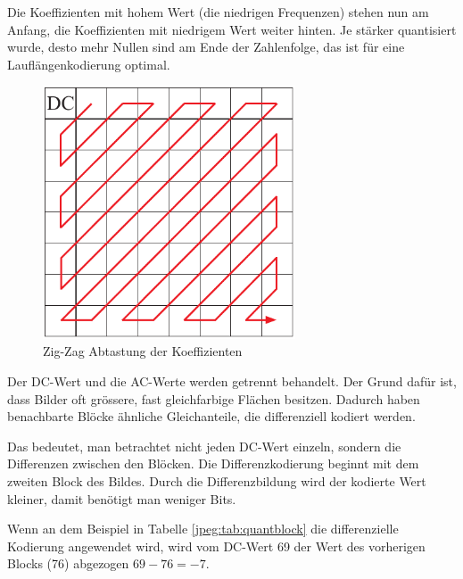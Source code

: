 Die Koeffizienten mit hohem Wert (die niedrigen Frequenzen) stehen nun am Anfang, die Koeffizienten mit niedrigem Wert weiter hinten.
Je stärker quantisiert wurde, desto mehr Nullen sind am Ende der Zahlenfolge, das ist für eine Lauflängenkodierung optimal.

\begin{figure}
    \centering
    \includegraphics[width=75mm]{papers/jpeg/pictures/zigzag.pdf}
    \caption{Zig-Zag Abtastung der Koeffizienten
        \label{jpeg:fig:zigzag}}
\end{figure}

Der DC-Wert und die AC-Werte werden getrennt behandelt.
Der Grund dafür ist, dass Bilder oft grössere, fast gleichfarbige Flächen besitzen.
Dadurch haben benachbarte Blöcke ähnliche Gleichanteile, die differenziell kodiert werden.

Das bedeutet, man betrachtet nicht jeden DC-Wert einzeln, sondern die Differenzen zwischen den Blöcken.
Die Differenzkodierung beginnt mit dem zweiten Block des Bildes.
Durch die Differenzbildung wird der kodierte Wert kleiner, damit benötigt man weniger Bits.

\begin{beispiel}
\label{jpeg:beispie:differenzcodierung}
Wenn an dem Beispiel in Tabelle \ref{jpeg:tab:quantblock} die differenzielle Kodierung angewendet wird, wird vom DC-Wert 69 der Wert des vorherigen Blocks (76) abgezogen \(69-76 = -7\).
\end{beispiel}


